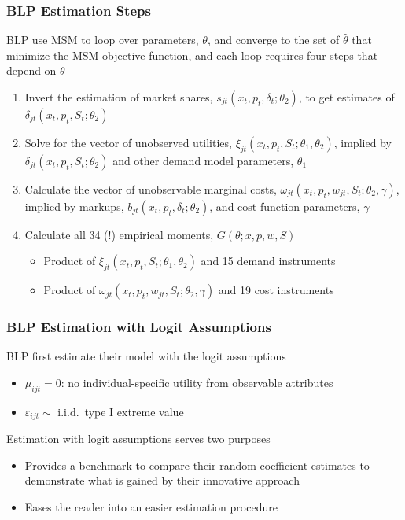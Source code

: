 \documentclass{beamer}
\begin{document}
\begin{frame}\frametitle{BLP Estimation Steps}
    BLP use MSM to loop over parameters, $\theta$, and converge to the set of $\hat{\theta}$ that minimize the MSM objective function, and each loop requires four steps that depend on $\theta$
    \begin{enumerate}
        \item Invert the estimation of market shares, $s_{jt}(x_t, p_t, \delta_t; \theta_2)$, to get estimates of $\delta_{jt}(x_t, p_t, S_t; \theta_2)$
        \item Solve for the vector of unobserved utilities, $\xi_{jt}(x_t, p_t, S_t; \theta_1, \theta_2)$, implied by $\delta_{jt}(x_t, p_t, S_t; \theta_2)$ and other demand model parameters, $\theta_1$
        \item Calculate the vector of unobservable marginal costs, $\omega_{jt}(x_t, p_t, w_{jt}, S_t; \theta_2, \gamma)$, implied by markups, $b_{jt}(x_t, p_t, \delta_t; \theta_2)$, and cost function parameters, $\gamma$
        \item Calculate all 34 (!) empirical moments, $G(\theta; x, p, w, S)$
        \begin{itemize}
            \item Product of $\xi_{jt}(x_t, p_t, S_t; \theta_1, \theta_2)$ and 15 demand instruments
            \item Product of $\omega_{jt}(x_t, p_t, w_{jt}, S_t; \theta_2, \gamma)$ and 19 cost instruments
        \end{itemize}
    \end{enumerate}
\end{frame}

\begin{frame}\frametitle{BLP Estimation with Logit Assumptions}
    BLP first estimate their model with the logit assumptions
    \begin{itemize}
        \item $\mu_{ijt} = 0$: no individual-specific utility from observable attributes
        \item $\varepsilon_{ijt} \sim$ i.i.d.\ type I extreme value
    \end{itemize}
    \vspace{3ex}
    Estimation with logit assumptions serves two purposes
    \begin{itemize}
        \item Provides a benchmark to compare their random coefficient estimates to demonstrate what is gained by their innovative approach
        \item Eases the reader into an easier estimation procedure
    \end{itemize}
\end{frame}
\end{document}
